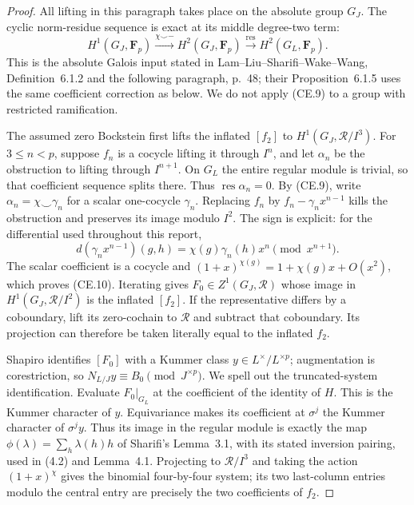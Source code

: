 \begin{proof}
All lifting in this paragraph takes place on the absolute
group \(G_J\).  The cyclic norm-residue sequence is exact at
its middle degree-two term:
\[
 H^1(G_J,\mathbf F_p)
 \xrightarrow{\chi\smile-}H^2(G_J,\mathbf F_p)
 \xrightarrow{\operatorname{res}}H^2(G_L,\mathbf F_p).
                                                        \tag{CE.9}
\]
This is the absolute Galois input stated in
Lam--Liu--Sharifi--Wake--Wang, Definition~6.1.2 and the
following paragraph, p.~48; their Proposition~6.1.5 uses
the same coefficient correction as below.  We do not
apply (CE.9) to a group with restricted ramification.

The assumed zero Bockstein first lifts the inflated
\([f_2]\) to \(H^1(G_J,\mathcal R/I^3)\).
For \(3\le n<p\), suppose \(f_n\) is a cocycle lifting it
through \(I^n\), and let \(\alpha_n\) be the obstruction
to lifting through \(I^{n+1}\).  On \(G_L\) the entire
regular module is trivial, so that coefficient sequence
splits there.  Thus \(\operatorname{res}\alpha_n=0\).
By (CE.9), write \(\alpha_n=\chi\smile\gamma_n\)
for a scalar one-cocycle \(\gamma_n\).
Replacing \(f_n\) by \(f_n-\gamma_n x^{n-1}\)
kills the obstruction and preserves its image modulo
\(I^2\).  The sign is explicit: for the differential used
throughout this report,
\[
 d(\gamma_n x^{n-1})(g,h)
       =\chi(g)\gamma_n(h)x^n\pmod{x^{n+1}}.
                                                       \tag{CE.10}
\]
The scalar coefficient is a cocycle and
\((1+x)^{\chi(g)}=1+\chi(g)x+O(x^2)\), which proves
(CE.10).  Iterating gives
\(F_0\in Z^1(G_J,\mathcal R)\) whose image in
\(H^1(G_J,\mathcal R/I^2)\) is the inflated \([f_2]\).
If the representative differs by a coboundary, lift
its zero-cochain to \(\mathcal R\) and subtract that
coboundary.  Its projection can therefore be taken
literally equal to the inflated \(f_2\).

Shapiro identifies \([F_0]\) with a Kummer class
\(y\in L^\times/L^{\times p}\); augmentation is
corestriction, so \(N_{L/J}y\equiv B_0\pmod{J^{\times p}}\).
We spell out the truncated-system identification.
Evaluate \(F_0|_{G_L}\) at the coefficient of the
identity of \(H\).  This is the Kummer character of
\(y\).  Equivariance makes its coefficient at
\(\sigma^j\) the Kummer character of \(\sigma^j y\).
Thus its image in the regular module is
exactly the map \(\phi(\lambda)=\sum_h\lambda(h)h\)
of Sharifi's Lemma~3.1, with its stated inversion
pairing, used in (4.2) and Lemma~4.1.
Projecting to \(\mathcal R/I^3\) and taking the action
\((1+x)^\chi\) gives the binomial four-by-four system;
its two last-column entries modulo the central entry
are precisely the two coefficients of \(f_2\).


\end{proof}

